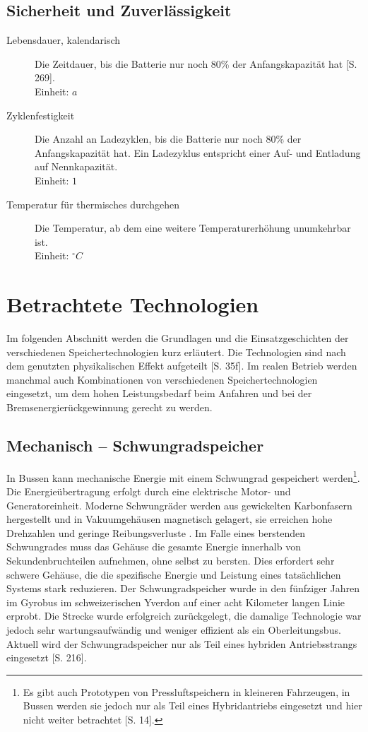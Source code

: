 \subsection{Sicherheit und Zuverlässigkeit}
\begin{description}
	\item[Lebensdauer, kalendarisch] Die Zeitdauer, bis die Batterie nur noch 80\% der Anfangskapazität hat \cite{Sterner:2014}[S. 269]. \\
	Einheit: $a$
	\item[Zyklenfestigkeit] Die Anzahl an Ladezyklen, bis die Batterie nur noch 80\% der Anfangskapazität hat. Ein Ladezyklus entspricht einer Auf- und Entladung auf Nennkapazität.\\
	Einheit: $1$
	\item[Temperatur für thermisches durchgehen] Die Temperatur, ab dem eine weitere Temperaturerhöhung unumkehrbar ist.\\
	Einheit: $^\circ C$
\end{description}

\section{Betrachtete Technologien}
Im folgenden Abschnitt werden die Grundlagen und die Einsatzgeschichten der verschiedenen Speichertechnologien kurz erläutert. Die Technologien sind nach dem genutzten physikalischen Effekt aufgeteilt \cite{Sterner:2014}[S. 35f]. Im realen Betrieb werden manchmal auch Kombinationen von verschiedenen Speichertechnologien eingesetzt, um dem hohen Leistungsbedarf beim Anfahren und bei der Bremsenergierückgewinnung gerecht zu werden.

\subsection{Mechanisch – Schwungradspeicher}
In Bussen kann mechanische Energie mit einem Schwungrad gespeichert werden\footnote{Es gibt auch Prototypen von Pressluftspeichern in kleineren Fahrzeugen, in Bussen werden sie jedoch nur als Teil eines Hybridantriebs eingesetzt und hier nicht weiter betrachtet \cite{Sebastian-Naumann:2014}[S. 14].}. Die Energieübertragung erfolgt durch eine elektrische Motor- und Generatoreinheit. Moderne Schwungräder werden aus gewickelten Karbonfasern hergestellt und in Vakuumgehäusen magnetisch gelagert, sie erreichen hohe Drehzahlen und geringe Reibungsverluste \cite{993788}. Im Falle eines berstenden Schwungrades muss das Gehäuse die gesamte Energie innerhalb von Sekundenbruchteilen aufnehmen, ohne selbst zu bersten. Dies erfordert sehr schwere Gehäuse, die die spezifische Energie und Leistung eines tatsächlichen Systems stark reduzieren. Der Schwungradspeicher wurde in den fünfziger Jahren im Gyrobus im schweizerischen Yverdon auf einer acht Kilometer langen Linie erprobt. Die Strecke wurde erfolgreich zurückgelegt, die damalige Technologie war jedoch sehr wartungsaufwändig und weniger effizient als ein Oberleitungsbus. Aktuell wird der Schwungradspeicher nur als Teil eines hybriden Antriebsstrangs eingesetzt \cite{tub_aleph001746639}[S. 216].

